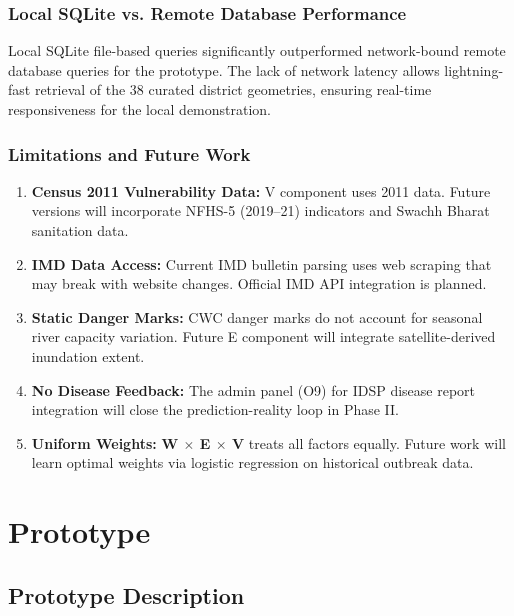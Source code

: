 \documentclass[12pt,a4paper]{report}
\begin{document}
\subsection{Local SQLite vs. Remote Database Performance}

Local SQLite file-based queries significantly outperformed network-bound remote database queries for the prototype. The lack of network latency allows lightning-fast retrieval of the 38 curated district geometries, ensuring real-time responsiveness for the local demonstration.

\subsection{Limitations and Future Work}

\begin{enumerate}[noitemsep]
  \item \textbf{Census 2011 Vulnerability Data:} V component uses 2011 data. Future versions will incorporate NFHS-5 (2019--21) indicators and Swachh Bharat sanitation data.
  \item \textbf{IMD Data Access:} Current IMD bulletin parsing uses web scraping that may break with website changes. Official IMD API integration is planned.
  \item \textbf{Static Danger Marks:} CWC danger marks do not account for seasonal river capacity variation. Future E component will integrate satellite-derived inundation extent.
  \item \textbf{No Disease Feedback:} The admin panel (O9) for IDSP disease report integration will close the prediction-reality loop in Phase II.
  \item \textbf{Uniform Weights:} \textbf{W $\times$ E $\times$ V} treats all factors equally. Future work will learn optimal weights via logistic regression on historical outbreak data.
\end{enumerate}

\chapter{Prototype}

\section{Prototype Description}
\end{document}
